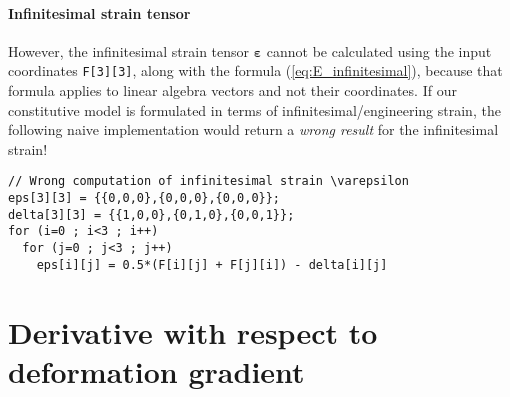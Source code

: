 \documentclass[letterpaper,12pt,oneside]{report}
\begin{document}
\paragraph{Infinitesimal strain tensor}
However, the infinitesimal strain tensor $\mathbf{\varepsilon}$ cannot be calculated using the input coordinates \texttt{F[3][3]}, along with the formula (\ref{eq:E_infinitesimal}), because that formula applies to linear algebra vectors and not their coordinates. If our constitutive model is formulated in terms of infinitesimal/engineering strain, the following naive implementation would return a \emph{wrong result} for the infinitesimal strain!
\begin{verbatim}
// Wrong computation of infinitesimal strain \varepsilon
eps[3][3] = {{0,0,0},{0,0,0},{0,0,0}};
delta[3][3] = {{1,0,0},{0,1,0},{0,0,1}};
for (i=0 ; i<3 ; i++)
  for (j=0 ; j<3 ; j++)
    eps[i][j] = 0.5*(F[i][j] + F[j][i]) - delta[i][j]
\end{verbatim}
























\section{Derivative with respect to deformation gradient}
\end{document}
